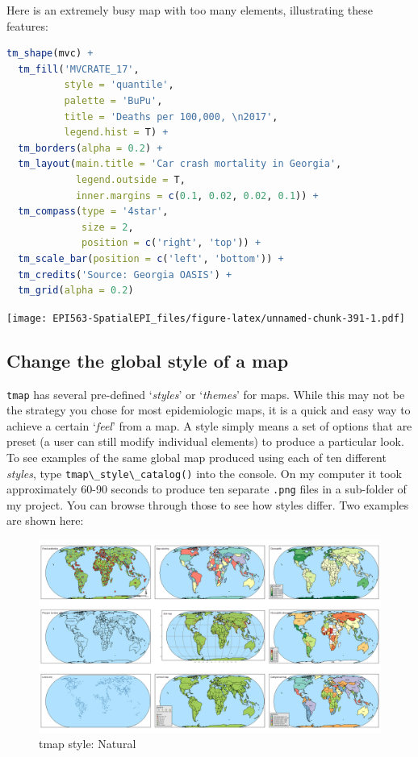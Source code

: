 \documentclass[
]{book}
\newcommand{\passthrough}[1]{#1}
\begin{document}
Here is an extremely busy map with too many elements, illustrating these features:

\begin{lstlisting}[language=R]
tm_shape(mvc) +
  tm_fill('MVCRATE_17',
          style = 'quantile',
          palette = 'BuPu',
          title = 'Deaths per 100,000, \n2017',
          legend.hist = T) +
  tm_borders(alpha = 0.2) +
  tm_layout(main.title = 'Car crash mortality in Georgia',
            legend.outside = T, 
            inner.margins = c(0.1, 0.02, 0.02, 0.1)) +
  tm_compass(type = '4star', 
             size = 2,
             position = c('right', 'top')) +
  tm_scale_bar(position = c('left', 'bottom')) +
  tm_credits('Source: Georgia OASIS') +
  tm_grid(alpha = 0.2)
\end{lstlisting}

\texttt{[image: EPI563-SpatialEPI\_files/figure-latex/unnamed-chunk-391-1.pdf]}

\hypertarget{change-the-global-style-of-a-map}{%
\subsection{Change the global style of a map}\label{change-the-global-style-of-a-map}}

\passthrough{\lstinline!tmap!} has several pre-defined `\emph{styles}' or `\emph{themes}' for maps. While this may not be the strategy you chose for most epidemiologic maps, it is a quick and easy way to achieve a certain `\emph{feel}' from a map. A style simply means a set of options that are preset (a user can still modify individual elements) to produce a particular look. To see examples of the same global map produced using each of ten different \emph{styles}, type \passthrough{\lstinline!tmap\_style\_catalog()!} into the console. On my computer it took approximately 60-90 seconds to produce ten separate \passthrough{\lstinline!.png!} files in a sub-folder of my project. You can browse through those to see how styles differ. Two examples are shown here:

\begin{figure}
\includegraphics[width=0.5\linewidth]{images/natural} \caption{tmap style: Natural}\label{fig:unnamed-chunk-392}
\end{figure}
\end{document}
